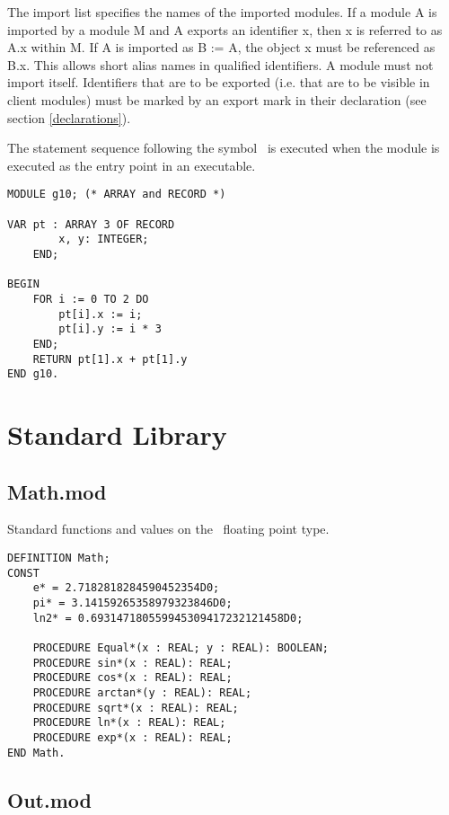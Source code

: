 \documentclass[12pt]{article}
\begin{document}
The import list specifies the names of the imported modules. If a module A is imported by a module M and A exports an identifier x, then x is referred to as A.x within M. If A is imported as B := A, the object x must be referenced as B.x. This allows short alias names in qualified identifiers. A module must not import itself. Identifiers that are to be exported (i.e. that are to be visible in client modules) must be marked by an export mark in their declaration (see section \ref{declarations}).


The statement sequence following the symbol \BEGIN\ is executed when the module is executed as the entry point in an executable.

\begin{lstlisting}[style=oberon]
MODULE g10; (* ARRAY and RECORD *)
    
VAR pt : ARRAY 3 OF RECORD
        x, y: INTEGER;
    END;

BEGIN
    FOR i := 0 TO 2 DO
        pt[i].x := i;
        pt[i].y := i * 3
    END;
    RETURN pt[1].x + pt[1].y
END g10.    
\end{lstlisting} 

\section{Standard Library}

\subsection{Math.mod}

Standard functions and values on the \REAL\ floating point type.

\begin{lstlisting}[style=oberon]
DEFINITION Math;
CONST
    e* = 2.7182818284590452354D0;
    pi* = 3.14159265358979323846D0;
    ln2* = 0.693147180559945309417232121458D0;

    PROCEDURE Equal*(x : REAL; y : REAL): BOOLEAN;
    PROCEDURE sin*(x : REAL): REAL;
    PROCEDURE cos*(x : REAL): REAL;
    PROCEDURE arctan*(y : REAL): REAL;
    PROCEDURE sqrt*(x : REAL): REAL;
    PROCEDURE ln*(x : REAL): REAL;
    PROCEDURE exp*(x : REAL): REAL;
END Math.
\end{lstlisting} 

\subsection{Out.mod}
\end{document}
